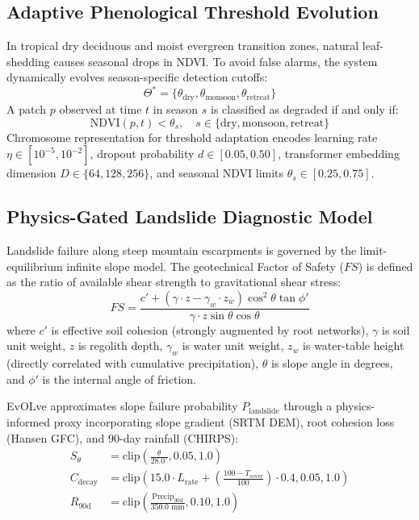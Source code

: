 \documentclass[conference]{IEEEtran}
\begin{document}
\subsection{Adaptive Phenological Threshold Evolution}
In tropical dry deciduous and moist evergreen transition zones, natural leaf-shedding causes seasonal drops in NDVI. To avoid false alarms, the system dynamically evolves season-specific detection cutoffs:
\begin{equation}
\Theta^* = \{\theta_{\text{dry}}, \theta_{\text{monsoon}}, \theta_{\text{retreat}}\}
\end{equation}
A patch $p$ observed at time $t$ in season $s$ is classified as degraded if and only if:
\begin{equation}
\text{NDVI}(p, t) < \theta_s, \quad s \in \{\text{dry}, \text{monsoon}, \text{retreat}\}
\end{equation}
Chromosome representation for threshold adaptation encodes learning rate $\eta \in [10^{-5}, 10^{-2}]$, dropout probability $d \in [0.05, 0.50]$, transformer embedding dimension $D \in \{64, 128, 256\}$, and seasonal NDVI limits $\theta_s \in [0.25, 0.75]$.

\subsection{Physics-Gated Landslide Diagnostic Model}
Landslide failure along steep mountain escarpments is governed by the limit-equilibrium infinite slope model. The geotechnical Factor of Safety ($FS$) is defined as the ratio of available shear strength to gravitational shear stress:
\begin{equation}
FS = \frac{c' + (\gamma \cdot z - \gamma_w \cdot z_w) \cos^2 \theta \tan \phi'}{\gamma \cdot z \sin \theta \cos \theta}
\end{equation}
where $c'$ is effective soil cohesion (strongly augmented by root networks), $\gamma$ is soil unit weight, $z$ is regolith depth, $\gamma_w$ is water unit weight, $z_w$ is water-table height (directly correlated with cumulative precipitation), $\theta$ is slope angle in degrees, and $\phi'$ is the internal angle of friction.

EvOLve approximates slope failure probability $P_{\text{landslide}}$ through a physics-informed proxy incorporating slope gradient (SRTM DEM), root cohesion loss (Hansen GFC), and 90-day rainfall (CHIRPS):
\begin{align}
S_{\theta} &= \text{clip}\left(\frac{\theta}{28.0^\circ}, 0.05, 1.0\right) \\
C_{\text{decay}} &= \text{clip}\left(15.0 \cdot L_{\text{rate}} + \left(\frac{100 - T_{\text{cover}}}{100}\right) \cdot 0.4, 0.05, 1.0\right) \\
R_{90\text{d}} &= \text{clip}\left(\frac{\text{Precip}_{90\text{d}}}{350.0\text{ mm}}, 0.10, 1.0\right)
\end{align}
\end{document}
